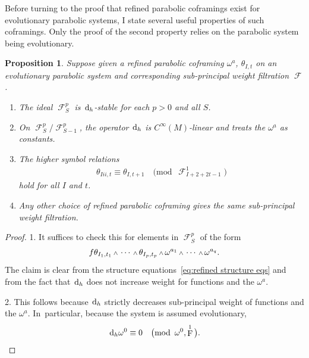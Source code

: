 \documentclass[10pt,a4paper]{amsart}
\renewcommand{\d}{{\rm d}}
\renewcommand{\mod}[1]{\quad\big(\mathrm{mod\enspace} #1\big)}
\newcommand{\w}{{\mathchoice{\,{\scriptstyle\wedge}\,}{{\scriptstyle\wedge}}
 {{\scriptscriptstyle\wedge}}{{\scriptscriptstyle\wedge}}}}
\newcommand{\thetas}[1]{\theta_{#1}}
\DeclareMathOperator{\pwf}{F}
\DeclareMathOperator{\swf}{\mathcal{F}}
\renewcommand{\dh}{\ensuremath{\hspace{1pt} \d_h}}
\newcommand{\cMinfty}{C^\infty(M)}
\numberwithin{equation}{section}
\newtheorem{Proposition}[Theorem]{Proposition}
{ \theoremstyle{definition}
\newtheorem{Definition}[Theorem]{Definition}
\newtheorem{Example}[Theorem]{Example}
\newtheorem{Remark}[Theorem]{Remark} }
\begin{document}
\begin{Example}
 Before turning to the proof that refined parabolic coframings exist for evolutionary parabolic systems, I state several useful properties of such coframings. Only the proof of the second property relies on the parabolic system being evolutionary.
 \begin{Proposition}
 Suppose given a refined parabolic coframing $\omega^a$, $\thetas{I,t}$ on an evolutionary parabolic system and corresponding sub-principal weight filtration $\swf$.
 \begin{enumerate}\itemsep=0pt
 \item[$1.$] The ideal $\swf^p_{S}$ is $\dh$-stable for each $p>0$ and all $S$.

 \item[$2.$] On $\swf^p_S / \swf^p_{S-1}$, the operator $\dh$ is $\cMinfty$-linear and treats the $\omega^a$ as constants.

 \item[$3.$] The higher symbol relations
 \begin{gather*}
 \thetas{Iii,t} \equiv \thetas{I,t+1} \mod{\swf^1_{I+2+2t-1}}
 \end{gather*}
 hold for all $I$ and $t$.

 \item[$4.$] Any other choice of refined parabolic coframing gives the same sub-principal weight filtration.
 \end{enumerate}
 \end{Proposition}
 \begin{proof}
 1. It suffices to check this for elements in $\swf^p_{S}$ of the form
 \begin{gather*}
 f \thetas{I_1,t_1}\w\cdots\w\thetas{I_p,t_p}\w\omega^{a_1}\w\cdots\w\omega^{a_{q}} .
 \end{gather*}
 The claim is clear from the structure equations~\eqref{eq:refined structure eqs} and from the fact that $\dh$ does not increase weight for functions and the $\omega^a$.

 2. This follows because $\dh$ strictly decreases sub-principal weight of functions and the $\omega^a$. In~particular, because the system is assumed evolutionary,
 \begin{gather*}
 \dh\omega^0 \equiv 0 \mod{\omega^0, \pwf^1} .
 \end{gather*}


\end{proof}
\end{Example}
\end{document}
